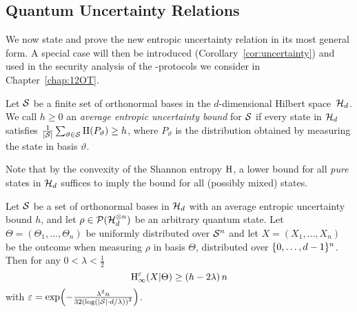 \subsection{Quantum Uncertainty Relations}
We now state and prove the new entropic uncertainty relation
in its most general form. A special case will then be introduced
(Corollary~\ref{cor:uncertainty})
and used in the security analysis of the \OT-protocols we consider
in Chapter~\ref{chap:12OT}. 
\begin{definition}\label{def:aeub}
  Let $\mathcal{S}$ be a finite set of orthonormal bases in the $d$-dimensional
  Hilbert space~$\mathcal{H}_d$.  We call $h \geq 0$ an {\em average
    entropic uncertainty bound} for $\mathcal{S}$ if every state in $\mathcal{H}_d$ satisfies $\frac{1}{|\mathcal{S}|} \sum_{\vartheta \in \mathcal{S}}\operatorname{H}(P_{\vartheta}) \geq h$, where $P_{\vartheta}$ is the
  distribution obtained by measuring the state in basis $\vartheta$.
\end{definition}
Note that by the convexity of the Shannon entropy $\operatorname{H}$, a lower bound
for all \emph{pure} states in $\mathcal{H}_d$ suffices to imply the bound
for all (possibly mixed) states.

\begin{theorem}\label{thm:genrel}
  Let $\mathcal{S}$ be a set of orthonormal bases in $\mathcal{H}_d$ with an
  average entropic uncertainty bound $h$, and let 
  $\rho \in \mathcal{P}(\mathcal{H}^{\otimes n}_d)$ be an arbitrary quantum state.
Let $\Theta = (\Theta_1,\ldots,\Theta_n)$ be uniformly distributed
over $\mathcal{S}^n$ and let $X = (X_1,\ldots,X_n)$ be the outcome when
measuring $\rho$ in basis $\Theta$, distributed over
\mbox{$\{0,\ldots, d-1\}^n$}.  Then for any $0 < \lambda < \frac12$
$$
\operatorname{H}_{\infty}^{\varepsilon}(X | \Theta) \geq \left(h-
  2\lambda \right)n 
$$
with 
$\varepsilon = \exp \!\left( - \frac{\lambda^2 n}{32
    \left(\log(|\mathcal{S}|\cdot d / \lambda) \right)^2} \right)$.
\end{theorem}


